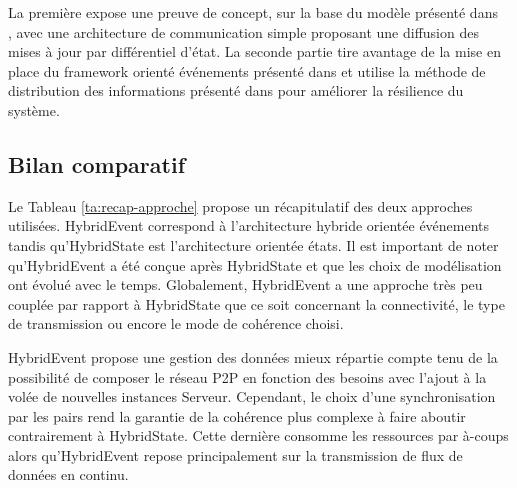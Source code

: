 La première expose une preuve de concept, sur la base du modèle présenté dans 
\\ \cite{Desprat2015a}, avec une architecture de communication simple proposant 
une diffusion des mises à jour par différentiel d'état. La seconde partie 
tire avantage de la mise en place du \gls{framework} orienté événements présenté 
dans \cite{Desprat2016} et utilise la méthode de distribution des informations 
présenté dans \cite{Desprat2017} pour améliorer la résilience du système. 







\subsection{Bilan comparatif}
Le Tableau \ref{ta:recap-approche} propose un récapitulatif des deux approches 
utilisées. HybridEvent correspond à l'architecture hybride \og orientée 
événements\fg{} tandis qu'HybridState est l'architecture \og orientée états\fg{}.
Il est important de noter qu'HybridEvent a été conçue après HybridState et que les 
choix de modélisation ont évolué avec le temps. Globalement, HybridEvent a une 
approche très peu couplée par rapport à HybridState que ce soit concernant la 
connectivité, le type de transmission ou encore le mode de cohérence choisi.

HybridEvent propose une gestion des données mieux répartie compte tenu de la 
possibilité de \og composer\fg{} le réseau \gls{P2P} en fonction des besoins avec 
l'ajout à la volée de nouvelles instances Serveur. Cependant, le choix d'une 
synchronisation par les pairs rend la garantie de la cohérence plus complexe à 
faire aboutir contrairement à HybridState. Cette dernière consomme les 
ressources par à-coups alors qu'HybridEvent repose principalement sur la 
transmission de flux de données en continu.

